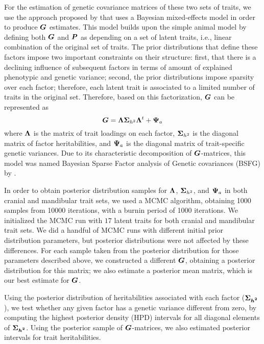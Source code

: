 \documentclass [twocolumn, natbib, nospthms, 10pt] {svjour3}
\begin{document}
For the estimation of genetic covariance matrices of these two sets of
traits, we use the approach proposed by \citet{runcie_dissecting_2013}
that uses a Bayesian mixed-effects model in order to produce $\boldsymbol{G}$
estimates. This model builds upon the simple animal model
\citep{lynch_genetics_1998} by defining both $\boldsymbol{G}$ and $\boldsymbol{P}$ as
depending on a set of latent traits, i.e., linear combination of the
original set of traits. The prior distributions that define these
factors impose two important constraints on their structure: first,
that there is a declining influence of subsequent factors in terms of
amount of explained phenotypic and genetic variance; second, the prior
distributions impose sparsity over each factor; therefore, each latent
trait is associated to a limited number of traits in the original
set. Therefore, based on this factorization, $\boldsymbol{G}$ can be
represented as
\begin{equation}
  \boldsymbol{G} = \boldsymbol{\Lambda} \boldsymbol{\Sigma}_{h^2} \boldsymbol{\Lambda}^t + 
  \boldsymbol{\Psi}_a
  \label {eq:G}
\end{equation}
where $\boldsymbol{\Lambda}$ is the matrix of trait loadings on each factor,
$\boldsymbol{\Sigma}_{h^2}$ is the diagonal matrix of factor heritabilities,
and $\boldsymbol{\Psi}_a$ is the diagonal matrix of trait-specific genetic
variances. Due to its characteristic decomposition of $\boldsymbol{G}$-matrices, this
model was named Bayesian Sparse Factor analysis of Genetic covariances
(BSFG) by \citet{runcie_dissecting_2013}.

In order to obtain posterior distribution samples for $\boldsymbol{\Lambda}$,
$\boldsymbol{\Sigma}_{h^2}$, and $\boldsymbol{\Psi}_a$ in both cranial and mandibular
trait sets, we used a MCMC algorithm, obtaining 1000 samples from
10000 iterations, with a burnin period of 1000 iterations. We
initialized the MCMC run with $17$ latent traits for both cranial and
mandibular trait sets. We did a handful of MCMC runs with different
initial prior distribution parameters, but posterior distributions
were not affected by these differences. For each sample taken from the
posterior distribution for those parameters described above, we
constructed a different $\boldsymbol{G}$, obtaining a posterior distribution
for this matrix; we also estimate a posterior mean matrix, which is
our best estimate for $\boldsymbol{G}$.

Using the posterior distribution of heritabilities associated with
each factor ($\boldsymbol{\Sigma_{h^2}}$), we test whether any given factor
has a genetic variance different from zero, by computing the highest
posterior density (HPD) intervals for all diagonal elements of
$\boldsymbol{\Sigma_{h^2}}$. Using the posterior sample of $\boldsymbol{G}$-matrices, we also
estimated posterior intervals for trait heritabilities.
\end{document}
